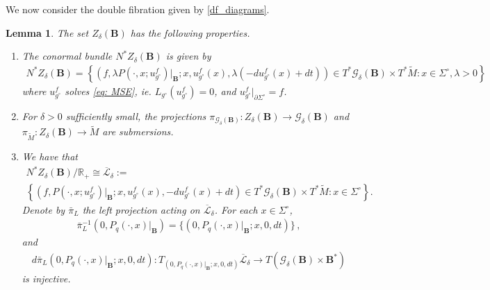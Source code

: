 \documentclass[11pt]{amsart}
\newtheorem{Lemma}[Theorem]{Lemma}
\theoremstyle{definition}
\numberwithin{equation}{section}
\newcommand{\G}{\mathcal G}
\newcommand{\p}{\partial}
\newcommand{\BB}{\mathbf B}
\begin{document}
We now consider the double fibration given by \eqref{df_diagrams}.

\begin{Lemma} \label{lem: injectivity at f = 0}
The set $Z_\delta(\BB)$ has the following properties.
\begin{enumerate}
\item[(i)]
The conormal bundle $N^*Z_\delta(\BB)$ is given by 
\begin{eqnarray}\label{eq: N*ZB}\nonumber
N^* Z_\delta(\BB) = \left\{\left(f, \lambda P(\cdot, x; u^f_{g^\circ})\vert_\BB; x, u_{g^\circ}^f(x),\lambda( - du_{g^\circ}^f(x) + dt )\right)\in T^* \G_\delta(\BB)\times T^*\widetilde M\colon x\in \Sigma^\circ, \lambda >0 \right\}
\end{eqnarray}
where $u^f_{g^\circ}$ solves \eqref{eq: MSE}, ie. $L_{g^\circ}(u^f_{g^\circ})=0$, and $u^f_{g^\circ}\vert_{\p\Sigma^\circ}=f$.
\item[(ii)] 
For $\delta>0$ sufficiently small, the projections $\pi_{\mathcal G_\delta(\BB)} :Z_\delta (\BB) \to \mathcal G_\delta(\BB)$ and $\pi_{\widetilde M}: Z_\delta(\BB) \to \widetilde M$ are submersions.
\item[(iii)]
We have that
\begin{multline}
    \label{eq: modded out conormal}
N^*Z_\delta(\BB)/\mathbb R_+ \cong \overline{\mathcal L}_\delta := \\
 \left\{\left(f,  P(\cdot, x; u^f_{g^\circ})\vert_\BB; x, u_{g^\circ}^f(x), - du_{g^\circ}^f(x) + dt \right)\in T^* \G_\delta(\BB)\times T^*\widetilde M\colon x\in \Sigma^\circ \right\}.
\end{multline}
Denote by $\bar\pi_L$ the left projection acting on $\overline{\mathcal L}_\delta$. For each $x\in \Sigma^\circ$, 
\begin{eqnarray}\label{eq: finite dim inj}
    \bar \pi_L^{-1}(0, P_q(\cdot, x)\vert_\BB) = \{(0, P_q(\cdot, x)\vert_\BB; x, 0, dt)\}\,,
\end{eqnarray}
and 
\begin{eqnarray}\label{eq: finite dim immersion}
d \bar \pi_L(0, P_q(\cdot, x)\vert_\BB; x, 0, dt)\colon T_{(0, P_q(\cdot, x)\vert_\BB; x, 0, dt)}\overline{\mathcal L}_\delta \to T(\G_\delta(\BB) \times \BB^*)
\end{eqnarray}
is injective.
\end{enumerate}
\end{Lemma}
\end{document}

